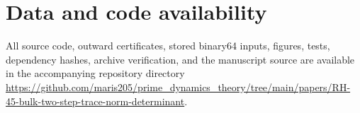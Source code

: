 \documentclass[11pt]{article}
\theoremstyle{definition}
\theoremstyle{remark}
\begin{document}
\section*{Data and code availability}

All source code, outward certificates, stored binary64 inputs, figures,
tests, dependency hashes, archive verification, and the manuscript source
are available in the accompanying repository directory
\url{https://github.com/maris205/prime_dynamics_theory/tree/main/papers/RH-45-bulk-two-step-trace-norm-determinant}.



\end{document}
